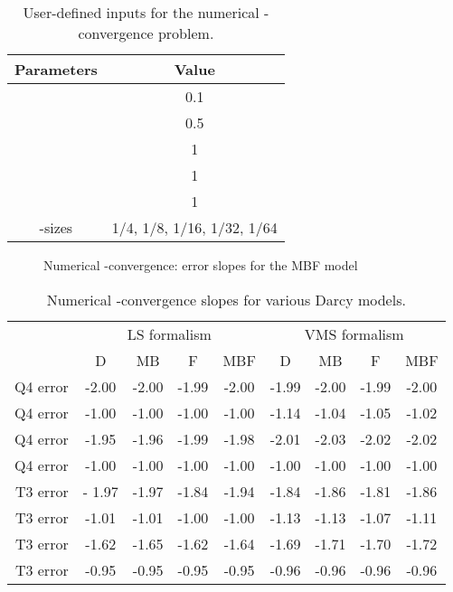 \documentclass[11pt,reqno]{amsart}
\begin{document}
\begin{table}[h!]
  \centering
  \caption{User-defined inputs for the numerical -convergence problem.}
  \begin{tabular}{cc}
    \hline
    Parameters & Value \\
    \hline
     & 0.1 \\
     & 0.5 \\
     & 1 \\
     & 1 \\
     & 1 \\
    -sizes & 1/4, 1/8, 1/16, 1/32, 1/64 \\
    \hline
  \end{tabular}
  \label{Tab:h_converge}
\end{table}
\begin{figure}[t!]
  \centering
  \caption{Numerical -convergence: error slopes for the MBF model}
  \label{Fig:Numerical_slopes_MBF}
\end{figure}
\begin{table}[h!]
  \centering
  \caption{Numerical -convergence slopes for various Darcy models.}
  \begin{tabular}{rcccc|cccc}
      \hline
       & \multicolumn{4}{c|}{LS formalism} & \multicolumn{4}{c}{VMS formalism} \\
       & D & MB & F & MBF & D & MB & F & MBF \\
      \hline
      Q4  error  & -2.00 & -2.00 & -1.99 & -2.00 & -1.99 & -2.00 & -1.99 & -2.00 \\
      Q4  error  & -1.00 & -1.00 & -1.00 & -1.00 & -1.14 & -1.04 & -1.05 & -1.02 \\
      Q4  error  & -1.95 & -1.96 & -1.99 & -1.98 & -2.01 & -2.03 & -2.02 & -2.02 \\
      Q4  error  & -1.00 & -1.00 & -1.00 & -1.00 & -1.00 & -1.00 & -1.00 & -1.00 \\
      \hline
      T3  error  & - 1.97 & -1.97 & -1.84 & -1.94 & -1.84 & -1.86 & -1.81 & -1.86 \\
      T3  error  & -1.01 & -1.01 & -1.00 & -1.00 & -1.13 & -1.13 & -1.07 & -1.11 \\
      T3  error  & -1.62 &  -1.65 & -1.62 & -1.64 & -1.69 & -1.71 & -1.70 & -1.72 \\
      T3  error  & -0.95 & -0.95 & -0.95 & -0.95 & -0.96 & -0.96 & -0.96 & -0.96 \\
      \hline
  \end{tabular}
  \label{Tab:h_convergence_table}
\end{table}
\end{document}
